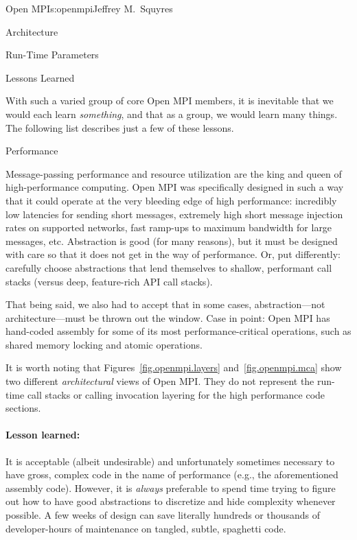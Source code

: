 \begin{aosachapter}{Open MPI}{s:openmpi}{Jeffrey M.\ Squyres}
\begin{aosasect1}{Architecture}
\begin{aosasect2}{Run-Time Parameters}
\end{aosasect2}

\end{aosasect1}


\begin{aosasect1}{Lessons Learned}

With such a varied group of core Open MPI members, it is inevitable that
we would each learn \emph{something}, and that as a group, we would
learn many things.  The following list describes just a few of these
lessons.


\begin{aosasect2}{Performance}

Message-passing performance and resource utilization are the king
and queen of high-performance computing.
%
Open MPI was specifically designed in such a way that it could operate
at the very bleeding edge of high performance: incredibly low
latencies for sending short messages, extremely high short message
injection rates on supported networks, fast ramp-ups to maximum
bandwidth for large messages, etc.
%
Abstraction is good (for many reasons), but it must be designed with
care so that it does not get in the way of performance.  Or, put
differently: carefully choose abstractions that lend themselves to
shallow, performant call stacks (versus deep, feature-rich API call
stacks).

That being said, we also had to accept that in some cases, abstraction---not 
architecture---must be thrown out the window.  Case in point:
Open MPI has hand-coded assembly for some of its most
performance-critical operations, such as shared memory locking and
atomic operations.

It is worth noting that Figures~\ref{fig.openmpi.layers}
and~\ref{fig.openmpi.mca} show two different \emph{architectural} views
of Open MPI.
%
They do not represent the run-time call stacks or calling invocation
layering for the high performance code sections.


\paragraph{Lesson learned:} 

It is acceptable (albeit undesirable) and unfortunately sometimes
necessary to have gross, complex code in the name of performance
(e.g., the aforementioned assembly code).
%
However, it is \emph{always} preferable to spend time trying to figure
out how to have good abstractions to discretize and hide complexity
whenever possible.  A few weeks of design can save literally hundreds
or thousands of developer-hours of maintenance on tangled, subtle, spaghetti
code.


\end{aosasect2}
\end{aosasect1}
\end{aosachapter}
